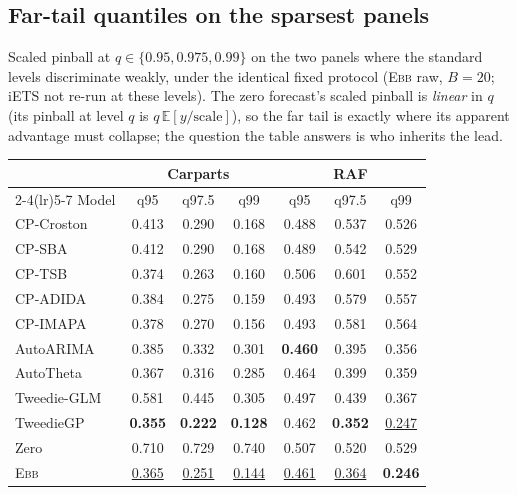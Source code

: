 \documentclass[twocolumn,10pt]{article}
\theoremstyle{definition}
\newcommand{\EBB}{\textsc{Ebb}}
\newcommand{\E}{\mathbb{E}}
\newcommand{\best}[1]{\textbf{#1}}
\newcommand{\secondbest}[1]{\underline{#1}}
\begin{document}
\subsection{Far-tail quantiles on the sparsest panels}
\label{app:fartail}

Scaled pinball at $q\in\{0.95,0.975,0.99\}$ on the two panels where the
standard levels discriminate weakly, under the identical fixed protocol
(\EBB{} raw, $B{=}20$; iETS not re-run at these levels). The zero
forecast's scaled pinball is \emph{linear} in $q$ (its pinball at level
$q$ is $q\,\E[y/\mathrm{scale}]$), so the far tail is exactly where its
apparent advantage must collapse; the question the table answers is who
inherits the lead.

\begin{table}[h]
\centering
\small
\setlength{\tabcolsep}{3.6pt}
\begin{tabular}{lccc@{\hspace{10pt}}ccc}
\toprule
 & \multicolumn{3}{c}{Carparts} & \multicolumn{3}{c}{RAF}\\
\cmidrule(lr){2-4}\cmidrule(lr){5-7}
Model & q95 & q97.5 & q99 & q95 & q97.5 & q99\\
\midrule
CP-Croston & 0.413 & 0.290 & 0.168 & 0.488 & 0.537 & 0.526\\
CP-SBA & 0.412 & 0.290 & 0.168 & 0.489 & 0.542 & 0.529\\
CP-TSB & 0.374 & 0.263 & 0.160 & 0.506 & 0.601 & 0.552\\
CP-ADIDA & 0.384 & 0.275 & 0.159 & 0.493 & 0.579 & 0.557\\
CP-IMAPA & 0.378 & 0.270 & 0.156 & 0.493 & 0.581 & 0.564\\
AutoARIMA & 0.385 & 0.332 & 0.301 & \best{0.460} & 0.395 & 0.356\\
AutoTheta & 0.367 & 0.316 & 0.285 & 0.464 & 0.399 & 0.359\\
Tweedie-GLM & 0.581 & 0.445 & 0.305 & 0.497 & 0.439 & 0.367\\
TweedieGP & \best{0.355} & \best{0.222} & \best{0.128} & 0.462 & \best{0.352} & \secondbest{0.247}\\
\midrule
Zero & 0.710 & 0.729 & 0.740 & 0.507 & 0.520 & 0.529\\
\midrule
\EBB{} & \secondbest{0.365} & \secondbest{0.251} & \secondbest{0.144} & \secondbest{0.461} & \secondbest{0.364} & \best{0.246}\\
\bottomrule
\end{tabular}
\end{table}
\end{document}
